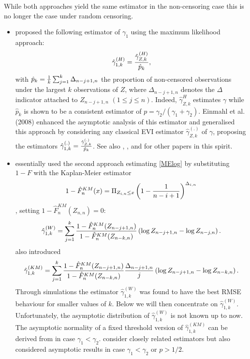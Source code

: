 \vspace{0.3cm}
While both approaches yield the same estimator in the non-censoring case this is no longer the case under random censoring. 
\begin{itemize}
\item
\cite{beirlant2007estimation} proposed the following estimator of $\gamma_1$ using the maximum likelihood approach:
\begin {equation}
\hat{\gamma}_{1,k}^{(H)} = {\hat{\gamma}_{Z,k}^{(H)} \over \hat{p}_k} ,
\label{Censored Hill}
\end {equation} 
with $\hat{p}_k = {1\over k} \sum_{j = 1}^k \Delta_{n-j+1,n}$ the proportion of non-censored observations under the largest $k$ observations of $Z$, where $\Delta_{n-j+1,n}$ denotes the $\Delta$ indicator attached to $Z_{n-j+1,n}$ $(1 \leq j \leq n)$. Indeed, $\hat{\gamma}_{Z,k}^H$ estimates $\gamma$ while $\hat{p}_k$ is shown to be a consistent estimator of $p=\gamma_2/(\gamma_1+\gamma_2)$. Einmahl et al. (2008) enhanced the asymptotic analysis of this estimator and generalised this approach by considering any classical EVI estimator $\hat{\gamma}_{Z,k}^{(.)}$ of $\gamma$, proposing the estimators 
$
\hat{\gamma}_{1,k}^{(.)}={\hat{\gamma}_{Z,k}^{(.)}\over \hat{p}_k}$.
See also \cite{gomes2003censoring}, \cite{gomes2011estimation}, and \cite{brahimi2015gaussian} for other papers in this spirit. 
\item
\cite{worms2014new} essentially used the second approach estimating \eqref{MElog} by substituting $1-F$ with the Kaplan-Meier estimator $$1-\hat{F}^{KM}_n (x) = \Pi_{Z_{i,n} \leq x} \left(1- {1 \over n-i+1} \right)^{\Delta_{i,n}}$$, setting $1-\hat{F}^{KM}_n (Z_{n,n})=0$: 
\begin {equation}
\hat{\gamma}_{1,k}^{(W)} = \sum_{j=1}^k {1-\hat{F}^{KM}_n (Z_{n-j+1,n}) \over 1-\hat{F}^{KM}_n (Z_{n-k,n})} \left( \log Z_{n-j+1,n}-\log Z_{n-j,n}\right).
\label{Worms}
\end {equation}
\cite{worms2014new} also introduced 
\begin {equation}
\hat{\gamma}_{1,k}^{(KM)} = \sum_{j=1}^k {1-\hat{F}^{KM}_n (Z_{n-j+1,n}) \over 1-\hat{F}^{KM}_n (Z_{n-k,n})}{\Delta_{n-j+1,n} \over j} \left( \log Z_{n-j+1,n}-\log Z_{n-k,n}\right).
\label{WormsKM}
\end {equation}
Through simulations the estimator $\hat{\gamma}^{(W)}_{1,k}$ was found to have the best RMSE behaviour for smaller values of $k$. Below we will then concentrate on $\hat{\gamma}_{1,k}^{(W)}$. Unfortunately, the asymptotic distribution of $\hat{\gamma}_{1,k}^{(W)}$ is not known up to now. The asymptotic normality of a fixed threshold version of $\hat{\gamma}_{1,k}^{(KM)}$ can be derived from \cite{worms2018extreme} in case $\gamma_1 < \gamma_2$. \cite{brahimi2015nelson} consider closely related estimators but also considered asymptotic results in case $\gamma_1 < \gamma_2$ or $p >1/2$. 

\end{itemize}
